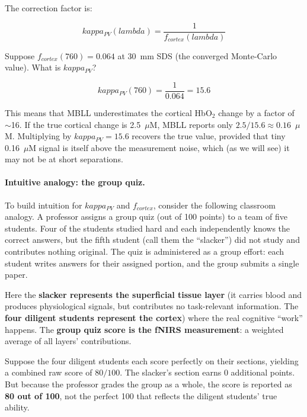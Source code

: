 \documentclass[12pt]{article}
\def\kappa{kappa}%
\def\lambda{lambda}%
\def\text#1{#1}%
\begin{document}
The correction factor is:

\begin{equation}
\kappa_{\text{PV}}(\lambda) = \frac{1}{f_{\text{cortex}}(\lambda)}
\end{equation}

\begin{workexample}
Suppose $f_{\text{cortex}}(760) = 0.064$ at 30~mm SDS (the converged Monte-Carlo value). What is $\kappa_{\text{PV}}$?

\begin{equation}
\kappa_{\text{PV}}(760) = \frac{1}{0.064} = 15.6
\end{equation}

This means that MBLL underestimates the cortical HbO$_2$ change by a factor of $\sim$16. If the true cortical change is 2.5~$\mu$M, MBLL reports only $2.5 / 15.6 \approx 0.16$~$\mu$M. Multiplying by $\kappa_{\text{PV}} = 15.6$ recovers the true value, provided that tiny 0.16~$\mu$M signal is itself above the measurement noise, which (as we will see) it may not be at short separations.
\end{workexample}

\paragraph{Intuitive analogy: the group quiz.}
To build intuition for $\kappa_{\text{PV}}$ and $f_{\text{cortex}}$, consider the following classroom analogy. A professor assigns a group quiz (out of 100 points) to a team of five students. Four of the students studied hard and each independently knows the correct answers, but the fifth student (call them the ``slacker'') did not study and contributes nothing original. The quiz is administered as a group effort: each student writes answers for their assigned portion, and the group submits a single paper.

Here the \textbf{slacker represents the superficial tissue layer} (it carries blood and produces physiological signals, but contributes no task-relevant information. The \textbf{four diligent students represent the cortex}) where the real cognitive ``work'' happens. The \textbf{group quiz score is the fNIRS measurement}: a weighted average of all layers' contributions.

Suppose the four diligent students each score perfectly on their sections, yielding a combined raw score of $80/100$. The slacker's section earns 0 additional points. But because the professor grades the group as a whole, the score is reported as \textbf{80 out of 100}, not the perfect 100 that reflects the diligent students' true ability.
\end{document}
